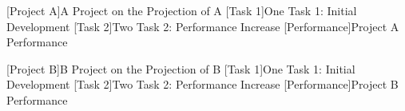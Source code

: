 
[Project A]{A Project on the Projection of A} 
[Task 1]{One Task 1: Initial Development}
[Task 2]{Two Task 2: Performance Increase}
[Performance]{Project A Performance}

[Project B]{B Project on the Projection of B} 
[Task 1]{One Task 1: Initial Development}
[Task 2]{Two Task 2: Performance Increase}
[Performance]{Project B Performance}


